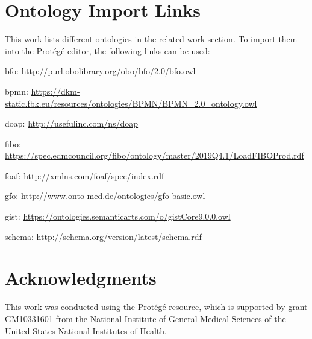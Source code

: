 \documentclass[a4paper, DIV=13, BCOR=0cm]{scrbook}
\begin{document}
\section{Ontology Import Links}
This work lists different ontologies in the related work section. To import them into the Protégé editor, the following links can be used:

\begin{asparadesc}
	\item [\gls{bfo}:] \url{http://purl.obolibrary.org/obo/bfo/2.0/bfo.owl}
	\item [\gls{bpmn}:] \url{https://dkm-static.fbk.eu/resources/ontologies/BPMN/BPMN_2.0_ontology.owl}
	\item [\gls{doap}:] \url{http://usefulinc.com/ns/doap}
	\item [\gls{fibo}:] \url{https://spec.edmcouncil.org/fibo/ontology/master/2019Q4.1/LoadFIBOProd.rdf}
	\item [\gls{foaf}:] \url{http://xmlns.com/foaf/spec/index.rdf}
	\item [\gls{gfo}:] \url{http://www.onto-med.de/ontologies/gfo-basic.owl}
	\item [\gls{gist}:] \url{https://ontologies.semanticarts.com/o/gistCore9.0.0.owl}
	\item [\gls{schema}:] \url{http://schema.org/version/latest/schema.rdf}
\end{asparadesc}

\section{Acknowledgments}
This work was conducted using the Protégé resource, which is supported by grant GM10331601 from the National Institute of General Medical Sciences of the United States National Institutes of Health.

\clearpage
\begin{multicols}{2}
	\printnoidxglossaries
\end{multicols}
\end{document}
